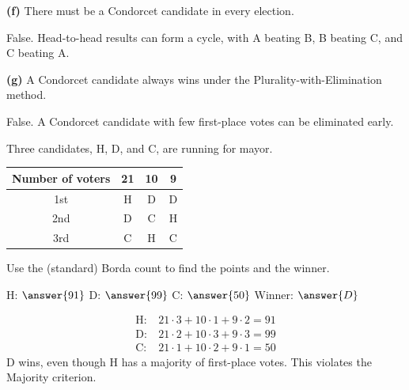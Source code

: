 \documentclass[12pt]{ximera}
\begin{document}
\begin{problem}
\begin{prompt}
\textbf{(f)} There must be a Condorcet candidate in every election.
\begin{multipleChoice}
\end{multipleChoice}
\begin{feedback}
False. Head-to-head results can form a cycle, with A beating B, B beating C, and C
beating A.
\end{feedback}
\end{prompt}

\begin{prompt}
\textbf{(g)} A Condorcet candidate always wins under the Plurality-with-Elimination
method.
\begin{multipleChoice}
\end{multipleChoice}
\begin{feedback}
False. A Condorcet candidate with few first-place votes can be eliminated early.
\end{feedback}
\end{prompt}
\end{problem}

\begin{problem}
Three candidates, H, D, and C, are running for mayor.
\begin{center}
\begin{tabular}{c|ccc}
Number of voters & 21 & 10 & 9\\\hline
1st & H & D & D\\
2nd & D & C & H\\
3rd & C & H & C
\end{tabular}
\end{center}
Use the (standard) Borda count to find the points and the winner.

H: $\answer{91}$ \quad D: $\answer{99}$ \quad C: $\answer{50}$ \qquad Winner: $\answer{D}$

\begin{feedback}
\[
\begin{aligned}
\text{H:}&\ 21\cdot3+10\cdot1+9\cdot2=91\\
\text{D:}&\ 21\cdot2+10\cdot3+9\cdot3=99\\
\text{C:}&\ 21\cdot1+10\cdot2+9\cdot1=50
\end{aligned}
\]
D wins, even though H has a majority of first-place votes. This violates the Majority
criterion.
\end{feedback}
\end{problem}
\end{document}
